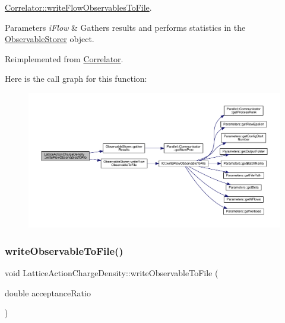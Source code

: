 \mbox{\hyperlink{class_correlator_a168512b2ce182d9478db47f100125fa6}{Correlator\+::write\+Flow\+Observables\+To\+File}}. 


\begin{DoxyParams}{Parameters}
{\em i\+Flow} & Gathers results and performs statistics in the \mbox{\hyperlink{class_observable_storer}{Observable\+Storer}} object. \\
\hline
\end{DoxyParams}


Reimplemented from \mbox{\hyperlink{class_correlator_a168512b2ce182d9478db47f100125fa6}{Correlator}}.

Here is the call graph for this function\+:\nopagebreak
\begin{figure}[H]
\begin{center}
\leavevmode
\includegraphics[width=350pt]{class_lattice_action_charge_density_a54226556dc1497c311e4a4d50bf44c26_cgraph}
\end{center}
\end{figure}
\mbox{\label{class_lattice_action_charge_density_a719f71aaccbf1b4147ea944781d69908}} 
\subsubsection{\texorpdfstring{writeObservableToFile()}{writeObservableToFile()}}
{\footnotesize\ttfamily void Lattice\+Action\+Charge\+Density\+::write\+Observable\+To\+File (\begin{DoxyParamCaption}\item[{double}]{acceptance\+Ratio }\end{DoxyParamCaption})\hspace{0.3cm}{\ttfamily [virtual]}}



